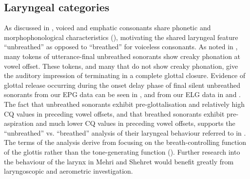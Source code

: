 \documentclass[output=paper]{langscibook}
\begin{document}
\subsection{Laryngeal categories} %
\label{sec:watson:5.2}
As discussed in , voiced and emphatic consonants share phonetic and morphophonological characteristics (\citealt{WatsonHeselwood2016}), motivating the shared laryngeal feature ``unbreathed'' as opposed to ``breathed'' for voiceless consonants. As noted in , many tokens of utterance-final unbreathed sonorants show creaky phonation at vowel offset. These tokens, and many that do not show creaky phonation, give the auditory impression of terminating in a complete glottal closure. Evidence of glottal release occurring during the onset delay phase of final silent unbreathed sonorants from our EPG data can be seen in , and from our ELG data in  and . The fact that unbreathed sonorants exhibit pre-glottalisation and relatively high CQ values in preceding vowel offsets, and that breathed sonorants exhibit pre-aspiration and much lower CQ values in preceding vowel offsets, supports the ``unbreathed'' vs. ``breathed'' analysis of their laryngeal behaviour referred to in . The terms of the analysis derive from focusing on the breath-controlling function of the glottis rather than the tone-generating function (\citealt{HeselwoodWatson2021}). Further research into the behaviour of the larynx in Mehri and Shehret would benefit greatly from laryngoscopic and aerometric investigation.
\end{document}
